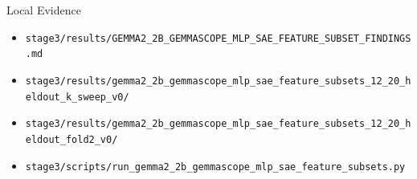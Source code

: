 \documentclass[aspectratio=169]{beamer}
\begin{document}
\begin{frame}{Local Evidence}
  \small
  \begin{itemize}
    \item \texttt{stage3/results/GEMMA2\_2B\_GEMMASCOPE\_MLP\_SAE\_FEATURE\_SUBSET\_FINDINGS.md}
    \item \texttt{stage3/results/gemma2\_2b\_gemmascope\_mlp\_sae\_feature\_subsets\_12\_20\_heldout\_k\_sweep\_v0/}
    \item \texttt{stage3/results/gemma2\_2b\_gemmascope\_mlp\_sae\_feature\_subsets\_12\_20\_heldout\_fold2\_v0/}
    \item \texttt{stage3/scripts/run\_gemma2\_2b\_gemmascope\_mlp\_sae\_feature\_subsets.py}
  \end{itemize}
\end{frame}
\end{document}

